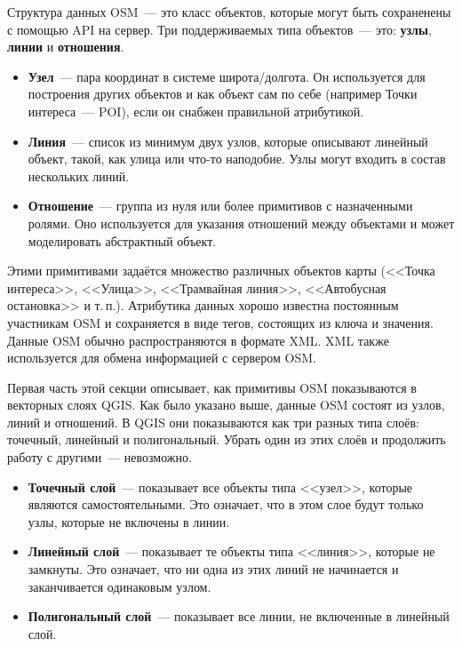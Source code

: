 Структура данных OSM~--- это класс объектов, которые могут быть сохраненены с
помощью API на сервер. Три поддерживаемых типа объектов~--- это: \textbf{узлы},
\textbf{линии} и \textbf{отношения}.

\begin{itemize}[label=--]
\item \textbf{Узел}~--- пара координат в системе широта/долгота. Он
используется для построения других объектов и как объект сам по себе
(например Точки интереса~--- POI), если он снабжен правильной атрибутикой.
\item \textbf{Линия}~--- список из минимум двух узлов, которые описывают
линейный объект, такой, как улица или что-то наподобие. Узлы могут
входить в состав нескольких линий.
\item \textbf{Отношение}~--- группа из нуля или более примитивов с
назначенными ролями. Оно используется для указания отношений между
объектами и может моделировать абстрактный объект.
\end{itemize}

Этими примитивами задаётся множество различных объектов карты
(<<Точка интереса>>, <<Улица>>, <<Трамвайная линия>>, <<Автобусная
остановка>> и т.\,п.). Атрибутика данных хорошо известна постоянным
участникам OSM и сохраняется в виде тегов, состоящих из ключа и
значения. Данные OSM обычно распространяются в формате XML. XML также
используется для обмена информацией с сервером OSM.

\label{qgis-osm-connection}

Первая часть этой секции описывает, как примитивы OSM показываются в
векторных слоях QGIS. Как было указано выше, данные OSM состоят из
узлов, линий и отношений. В QGIS они показываются как три разных типа
слоёв: точечный, линейный и полигональный. Убрать один из этих слоёв и
продолжить работу с другими~--- невозможно.

\begin{itemize}[label=--]
\item \textbf{Точечный слой}~--- показывает все объекты типа <<узел>>,
которые являются самостоятельными. Это означает, что в этом слое будут
только узлы, которые не включены в линии.
\item \textbf{Линейный слой}~--- показывает те объекты типа <<линия>>,
которые не замкнуты. Это означает, что ни одна из этих линий не
начинается и заканчивается одинаковым узлом.
\item \textbf{Полигональный слой}~--- показывает все линии, не
включенные в линейный слой.
\end{itemize}


